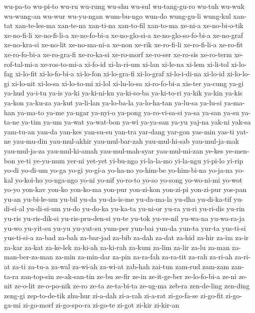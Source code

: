 {wu-pa-to wu-pi-to wu-ru wu-rung wu-shu wu-sul wu-tang-gu-ro wu-tuh wu-wuk
wu-wung-an wu-wur wu-yu-ngan wum-bu-ngo wun-do wung-gu-li wung-kul xan-tat
xan-te-les-ma xan-te-na xan-ti-na xan-to-fil xan-to-ma xe-ni-a
xe-no-bi-o-tik xe-no-fi-li xe-no-fi-li-a xe-no-fo-bi-a xe-no-glo-si-a
xe-no-glo-so-fo-bi-a xe-no-graf xe-no-kra-si xe-no-lit xe-no-ma-ni-a
xe-non xe-rik xe-ro-fi-li xe-ro-fi-li-a xe-ro-fit xe-ro-fo-bi-a
xe-ro-gra-fi xe-ro-ka-si xe-ro-morf xe-ro-ser xe-ro-sis xe-ro-term
xe-rof-tal-mi-a xe-ros-to-mi-a xi-fo-id xi-la-ri-um xi-lan xi-le-na xi-lem
xi-li-tol xi-lo-fag xi-lo-fit xi-lo-fo-bi-a xi-lo-fon xi-lo-gra-fi
xi-lo-graf xi-lo-i-di-na xi-lo-id xi-lo-lo-gi xi-lo-nit xi-lo-sa
xi-lo-to-mi xi-lol xi-lu-lo-sa xi-ro-fo-bi-a xis-ter ya-cung ya-gi ya-hud
ya-i-tu ya-is ya-ki ya-ki-ni-ku ya-ki-so-ba ya-ki-to-ri ya-kik ya-kin
ya-kis ya-kon ya-ku-za ya-kut ya-li-lan ya-lo-ba-la ya-lo-ha-tan ya-lu-sa
ya-lu-si ya-ma-han ya-ma-to ya-me ya-ngar ya-nyi-o ya-pong ya-ro-vi-sa-si
ya-sa ya-san ya-su ya-ta-ne ya-tim ya-um ya-wat ya-wat-bon ya-wi ya-ya-san
ya-yu yaj-na yak-ni yak-sa yam-tu-an yan-da yan-kes yan-su-su yan-tra
yar-dang yar-gon yas-min yas-ti yat-ne yau-mu-din yau-mul-akhir
yau-mul-bar-zah yau-mul-hi-sab yau-mul-ja-mak yau-mul-ja-za
yau-mul-ki-amah yau-mul-mah-syar yau-mul-mi-zan ye-kes ye-men-bon ye-ti
ye-yu-num yer-ni yet-yet yi-bu-ngo yi-la-la-mo yi-la-ngu yi-pi-lo yi-rip
yo-di yo-di-um yo-ga yo-gi yo-gi-a yo-ha-no yo-him-be yo-him-bi-na
yo-ja-na yo-kal yo-koi-ho yo-nga-ngo yo-ni yo-nif yo-ro-to yo-so yo-song
yo-wo-ni-mi yo-wot yo-yo yon-kav yon-ko yon-ko-ma yon-pur yon-zi-kon
yon-zi-pi yon-zi-pur yos-pan yu-an yu-bi-le-um yu-bil yu-da yu-da-is-me
yu-da-ma-la yu-dha yu-di-ka-tif yu-di-si-al yu-di-si-um yu-do yu-do-ka
yu-ka-ta yu-ni-or yu-ra yu-ri yu-ri-dis yu-rin yu-ris yu-ris-dik-si
yu-ris-pru-den-si yu-te yu-tok yu-ve-nil yu-wa-na yu-wa-ra-ja yu-wo
yu-yit-su yu-yu yu-yut-su yum-per yun-bai yun-da yun-ta yur-ta yus-ti-si
yus-ti-si-a za-bad za-bah za-bar-jad za-bib za-dah za-dat za-hid za-hir
za-im za-ir za-kar za-kat za-ke-lek za-ki-ah za-ki-rah za-kum za-lim
za-lir za-lu za-man za-man-ber-za-man za-min za-min-dar za-pin za-ra-fah
za-ra-tit za-rah za-ri-ah za-ri-at za-ti za-tu-a za-wal za-wi-ah za-wi-at
zab-hah zai-tun zam-rud zam-zam zan-ta-ra zan-top-sin ze-ak-san-tin ze-bu
ze-fir ze-in ze-it-ge-ber ze-lo-fo-bi-a ze-ni ze-nit ze-o-lit ze-o-po-nik
ze-ro ze-ta ze-ta-bi-ta ze-ug-ma zeb-ra zen-de-ling zen-ding zeng-gi
zep-to-de-tik zhu-hur zi-a-dah zi-a-rah zi-a-rat zi-go-fa-se zi-go-fit
zi-go-ga-mi zi-go-morf zi-go-spo-ra zi-go-te zi-got zi-kir zi-kir-an
}
